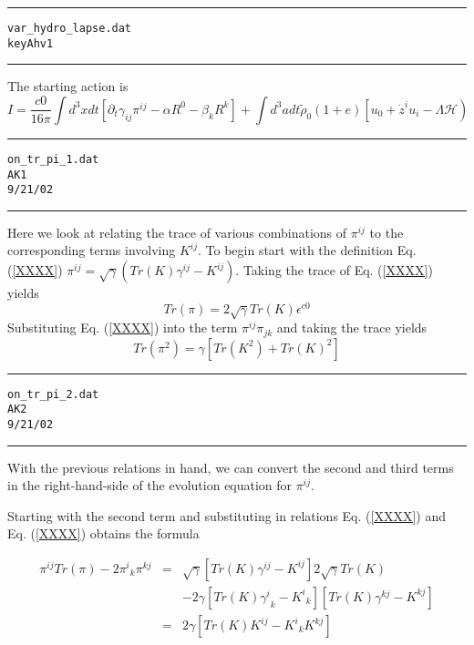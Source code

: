 \documentclass[12pt]{article}
\begin{document}
\clearpage
\vspace{5mm}
\hrule
\begin{alltt}
  var_hydro_lapse.dat
  key Ahv1
\end{alltt}
\hrule
\vspace{5mm}

The starting action is
\begin{equation}\label{Ahv1_1}
I = \frac{c0}{16 \pi} \int d^3x dt \left[ \partial_{t} {\gamma}_{i j} {\pi}^{i j} - \alpha R^0 - \beta_{k} R^{k} \right]
+ \int d^3a dt { \tilde \rho }_{0} ( 1 + e ) \left[ {u}_{0} + {\dot z}^{i} {u}_{i} - \Lambda \mathcal{H} \right)
\end{equation}
\clearpage
\vspace{5mm}
\hrule
\begin{alltt}
  on_tr_pi_1.dat
  AK1
  9/21/02
\end{alltt}
\hrule
\vspace{5mm}

Here we look at relating the trace of various combinations of $ {\pi}^{i j} $
to the corresponding terms involving $ {K}^{i j} $. To begin start with the
definition Eq. (\ref{XXXX}) $ {\pi}^{i j} = \sqrt{\gamma} \left( Tr( K ) {\gamma}^{i j} - {K}^{i j} \right) $.
Taking the trace of Eq. (\ref{XXXX}) yields
\begin{equation}\label{AK1_1}
Tr( \pi ) = 2 \sqrt{\gamma} Tr( K ) {\epsilon }^{ c0 }
\end{equation}
Substituting Eq. (\ref{XXXX}) into the term $ {\pi}^{i j} {\pi}_{j k} $ and taking
the trace yields
\begin{equation}\label{AK1_2}
Tr( \pi ^2 ) = \gamma \left[ Tr( K ^2 ) + Tr( K ) ^2 \right]
\end{equation}
\clearpage
\vspace{5mm}
\hrule
\begin{alltt}
  on_tr_pi_2.dat
  AK2
  9/21/02
\end{alltt}
\hrule
\vspace{5mm}

With the previous relations in hand, we can convert the second and
third terms in the right-hand-side of the evolution equation for $ {\pi}^{i j} $.

Starting with the second term and substituting in relations
Eq. (\ref{XXXX}) and Eq. (\ref{XXXX}) obtains the formula

\begin{eqnarray}\label{AK2_1}
{\pi}^{i j} Tr( \pi ) - 2 {\pi^i}_{k} {\pi}^{k j}
& = &
\sqrt{\gamma} \left[ Tr( K ) {\gamma}^{i j} - {K}^{i j} \right] 2 \sqrt{\gamma} Tr( K ) \nonumber \\
&   &
- 2 \gamma \left[ Tr( K ) {\gamma ^i }_{ k } - {K^i}_{k} \right]
\left[ Tr( K ) {\gamma}^{k j} - {K}^{k j} \right] \nonumber \\
& = &
2 \gamma \left[ Tr( K ) {K}^{i j} - {K^i}_{k} {K}^{k j} \right]
\end{eqnarray}
\end{document}
